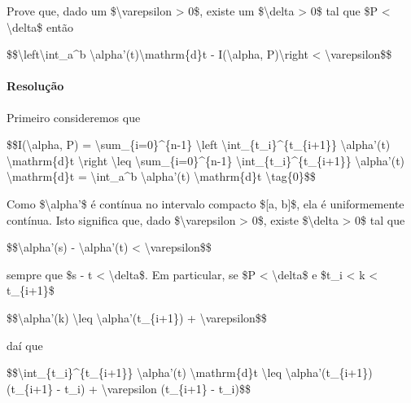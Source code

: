 Prove que, dado um \$\textbackslash{}varepsilon \textgreater{} 0\$,
existe um \$\textbackslash{}delta \textgreater{} 0\$ tal que
\$\textbar{}P\textbar{} \textless{} \textbackslash{}delta\$ então

\$\$\textbackslash{}left\textbar{}\textbackslash{}int\_a\^{}b
\textbar{}\textbackslash{}alpha'(t)\textbar{}\textbackslash{}mathrm\{d\}t
- I(\textbackslash{}alpha, P)\textbackslash{}right\textbar{} \textless{}
\textbackslash{}varepsilon\$\$

\hypertarget{resoluuxe7uxe3o}{%
\paragraph{Resolução}\label{resoluuxe7uxe3o}}

Primeiro consideremos que

\$\$I(\textbackslash{}alpha, P) =
\textbackslash{}sum\_\{i=0\}\^{}\{n-1\} \textbackslash{}left\textbar{}
\textbackslash{}int\_\{t\_i\}\^{}\{t\_\{i+1\}\}
\textbackslash{}alpha'(t) \textbackslash{}mathrm\{d\}t
\textbackslash{}right\textbar{} \textbackslash{}leq
\textbackslash{}sum\_\{i=0\}\^{}\{n-1\}
\textbackslash{}int\_\{t\_i\}\^{}\{t\_\{i+1\}\}
\textbar{}\textbackslash{}alpha'(t)\textbar{}
\textbackslash{}mathrm\{d\}t = \textbackslash{}int\_a\^{}b
\textbar{}\textbackslash{}alpha'(t)\textbar{}
\textbackslash{}mathrm\{d\}t \textbackslash{}tag\{0\}\$\$

Como \$\textbackslash{}alpha'\$ é contínua no intervalo compacto \${[}a,
b{]}\$, ela é uniformemente contínua. Isto significa que, dado
\$\textbackslash{}varepsilon \textgreater{} 0\$, existe
\$\textbackslash{}delta \textgreater{} 0\$ tal que

\$\$\textbar{}\textbackslash{}alpha'(s) -
\textbackslash{}alpha'(t)\textbar{} \textless{}
\textbackslash{}varepsilon\$\$

sempre que \$\textbar{}s - t\textbar{} \textless{}
\textbackslash{}delta\$. Em particular, se \$\textbar{}P\textbar{}
\textless{} \textbackslash{}delta\$ e \$t\_i \textless{} k \textless{}
t\_\{i+1\}\$

\$\$\textbar{}\textbackslash{}alpha'(k)\textbar{} \textbackslash{}leq
\textbar{}\textbackslash{}alpha'(t\_\{i+1\})\textbar{} +
\textbackslash{}varepsilon\$\$

daí que

\$\$\textbackslash{}int\_\{t\_i\}\^{}\{t\_\{i+1\}\}
\textbar{}\textbackslash{}alpha'(t)\textbar{}
\textbackslash{}mathrm\{d\}t \textbackslash{}leq
\textbar{}\textbackslash{}alpha'(t\_\{i+1\})\textbar{}(t\_\{i+1\} -
t\_i) + \textbackslash{}varepsilon (t\_\{i+1\} - t\_i)\$\$

